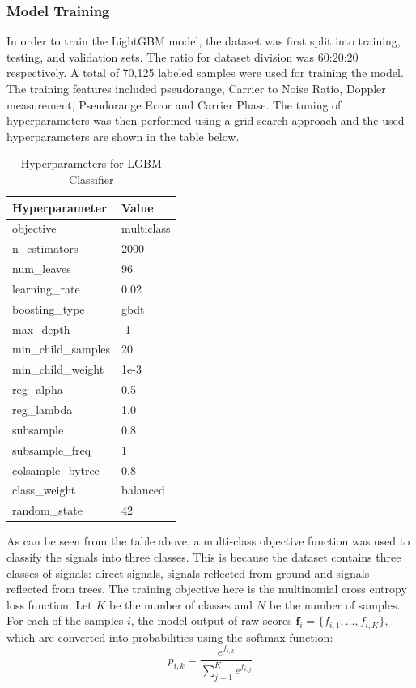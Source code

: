 \documentclass[12pt, a4paper]{article}
\begin{document}
\subsubsection{Model Training}
In order to train the LightGBM model, the dataset was first split into training,
testing, and validation sets. The ratio for dataset division was 60:20:20 respectively. A total of 70,125 
labeled samples were used for training the model. The training features included pseudorange, 
Carrier to Noise Ratio, Doppler measurement, Pseudorange Error and Carrier Phase.
The tuning of hyperparameters was then performed using a grid search approach and the used 
hyperparameters are shown in the table below. 
\begin{table}[H]
\centering
\label{tab:lgbm-hyperparams}
\renewcommand{\arraystretch}{1.2} %
\begin{tabular}{ll}
\toprule
\rowcolor{lightgray}
\textbf{Hyperparameter} & \textbf{Value} \\
\midrule
objective & multiclass \\
n\_estimators & 2000 \\
\rowcolor{gray!10}
num\_leaves & 96 \\
learning\_rate & 0.02 \\
\rowcolor{gray!10}
boosting\_type & gbdt \\
max\_depth & -1 \\
\rowcolor{gray!10}
min\_child\_samples & 20 \\
min\_child\_weight & 1e-3 \\
\rowcolor{gray!10}
reg\_alpha & 0.5 \\
reg\_lambda & 1.0 \\
\rowcolor{gray!10}
subsample & 0.8 \\
subsample\_freq & 1 \\
\rowcolor{gray!10}
colsample\_bytree & 0.8 \\
class\_weight & balanced \\
\rowcolor{gray!10}
random\_state & 42 \\
\bottomrule
\end{tabular}
\caption{Hyperparameters for LGBM Classifier}
\end{table}
As can be seen from the table above, a multi-class objective function was used
to classify the signals into three classes. This is because the dataset contains
three classes of signals: direct signals, signals reflected from ground and
signals reflected from trees. The training objective here is the multinomial 
cross entropy loss function. Let $K$ be the number of classes and $N$ be the number of samples.
For each of the samples $i$,  the model output of raw scores $\mathbf{f}_i =
\{f_{i,1}, \dots, f_{i,K}\}$, which are converted into probabilities using the softmax function:
\begin{equation}
    p_{i,k} = \frac{e^{f_{i,k}}}{\sum_{j=1}^{K} e^{f_{i,j}}}
\end{equation}
\end{document}
